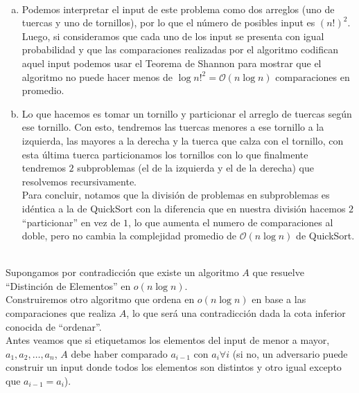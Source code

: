 \documentclass[dcc,uchile]{fcfmcourse}
\theoremstyle{plain}
\theoremstyle{definition}
\begin{document}
\begin{problems}
\\
\begin{enumerate}[a)]
    \item Podemos interpretar el input de este problema como dos arreglos (uno de tuercas y uno de tornillos), por lo que el número de posibles input es $(n!)^2$. Luego, si consideramos que cada uno de los input se presenta con igual probabilidad y que las comparaciones realizadas por el algoritmo codifican aquel input podemos usar el Teorema de Shannon para mostrar que el algoritmo no puede hacer menos de $\log{n!^2} = \mathcal{O}(n\log{n})$ comparaciones en promedio.
    
    \item Lo que hacemos es tomar un tornillo y particionar el arreglo de tuercas según ese tornillo. Con esto, tendremos las tuercas menores a ese tornillo a la izquierda, las mayores a la derecha y la tuerca que calza con el tornillo, con esta última tuerca particionamos los tornillos con lo que finalmente tendremos $2$ subproblemas (el de la izquierda y el de la derecha) que resolvemos recursivamente.\\
        Para concluir, notamos que la división de problemas en subproblemas es idéntica a la de QuickSort con la diferencia que en nuestra división hacemos $2$ ``particionar'' en vez de $1$, lo que aumenta el numero de comparaciones al doble, pero no cambia la complejidad promedio de $\mathcal{O}(n\log{n})$ de QuickSort.
    
\end{enumerate}


\\
 
 Supongamos por contradicción que existe un algoritmo $A$ que resuelve ``Distinción de Elementos'' en $o(n\log{n})$.\\
  Construiremos otro algoritmo que ordena en $o(n\log{n})$ en base a las comparaciones que realiza $A$, lo que será una contradicción dada la cota inferior conocida de ``ordenar''.\\
  
  Antes veamos que si etiquetamos los elementos del input de menor a mayor, $a_{1}, a_{2}, \ldots, a_{n}$, $A$ debe haber comparado $a_{i-1}$ con $a_{i} \forall i$ (si no, un adversario puede construir un input donde todos los elementos son distintos y otro igual excepto que $a_{i-1} = a_{i}$).\\
  

\end{problems}
\end{document}
